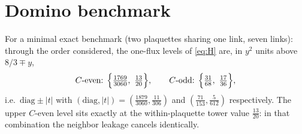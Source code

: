 \documentclass[11pt]{article}
\begin{document}
\section{Domino benchmark}
\label{app:domino}

For a minimal exact benchmark (two plaquettes sharing one link, seven
links): through the order considered, the one-flux levels of \eqref{eq:H}
are, in $y^2$ units above $8/3\mp y$,
\begin{equation}
C\text{-even: }\Bigl\{\tfrac{1769}{3060},\ \tfrac{13}{20}\Bigr\},
\qquad
C\text{-odd: }\Bigl\{\tfrac{31}{68},\ \tfrac{17}{36}\Bigr\},
\end{equation}
i.e.\ $\mathrm{diag}\pm|t|$ with
$(\mathrm{diag},|t|)=(\tfrac{1879}{3060},\tfrac{11}{306})$ and
$(\tfrac{71}{153},\tfrac{5}{612})$ respectively. The upper $C$-even level
sits exactly at the within-plaquette tower value $\tfrac{13}{20}$: in that
combination the neighbor leakage cancels identically.
\end{document}
